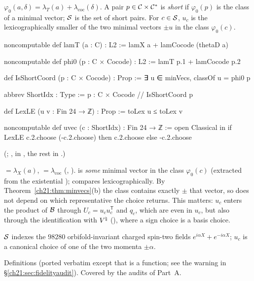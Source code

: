 \begin{definition}\label{ch21:def:short}
$\varphi_0(a,\delta)=\lambda_T(a)+\lambda_{\mathrm{coc}}(\delta)$.  A pair $p\in\mathcal{C}\times\mathcal{C}^*$
is \emph{short} if $\varphi_0(p)$ is the class of a minimal vector; $\mathcal{S}$ is the set of short
pairs.  For $c\in\mathcal{S}$, $u_c$ is the lexicographically smaller of the two minimal vectors $\pm u$
in the class $\varphi_0(c)$.
\end{definition}
\begin{leancode}
noncomputable def lamT (a : C) : L2 := lamX a + lamCocode (thetaD a)
\end{leancode}
\begin{leancode}
noncomputable def phi0 (p : C × Cocode) : L2 := lamT p.1 + lamCocode p.2
\end{leancode}
\begin{leancode}
def IsShortCoord (p : C × Cocode) : Prop := ∃ u ∈ minVecs, classOf u = phi0 p

abbrev ShortIdx : Type := {p : C × Cocode // IsShortCoord p}
\end{leancode}
\begin{leancode}
def LexLE (u v : Fin 24 → ℤ) : Prop := toLex u ≤ toLex v

noncomputable def uvec (c : ShortIdx) : Fin 24 → ℤ :=
  open Classical in
  if LexLE c.2.choose (-c.2.choose) then c.2.choose else -c.2.choose
\end{leancode}
(; ,  in
, the rest in .)
\begin{dictionary}
 $=\lambda_X(a)$,  $=\lambda_{\mathrm{coc}}$ (,
).   is \emph{some} minimal vector in the class $\varphi_0(c)$
(extracted from the existential );  compares lexicographically.  By
Theorem~\ref{ch21:thm:minvecs}(b) the class contains exactly $\pm$ that vector, so  does
not depend on which representative the choice returns.  This matters: $u_c$ enters the product of
$\mathcal{B}$ through $U_c=u_cu_c^{\mathsf T}$ and $q_c$, which are even in $u_c$, but also through the
identification with ${V^{\natural}}$ (), where a sign choice is a basis choice.
\end{dictionary}
\begin{physics}
$\mathcal{S}$ indexes the $98280$ orbifold-invariant charged spin-two fields
$e^{i\alpha X}+e^{-i\alpha X}$; $u_c$ is a canonical choice of one of the two momenta $\pm\alpha$.
\end{physics}
\begin{status}
Definitions (ported verbatim except that  is a function; see the warning in
\S\ref{ch21:sec:fidelityaudit}).  Covered by the audits of Part~A.
\end{status}

